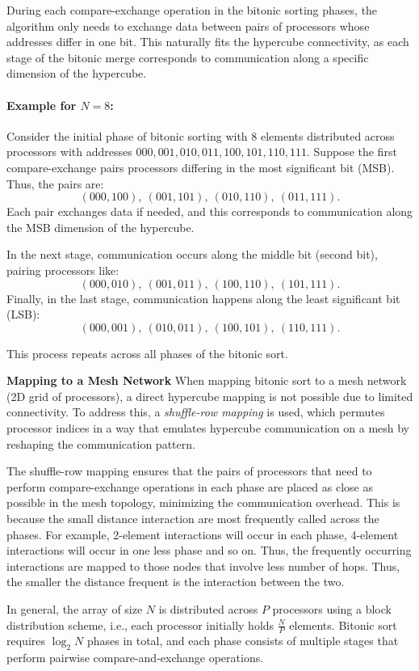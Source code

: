 \documentclass[12pt]{book}
\begin{document}
During each compare-exchange operation in the bitonic sorting phases, the algorithm only needs to 
exchange data between pairs of processors whose addresses differ in one bit. This naturally fits the hypercube connectivity, as each stage of the bitonic merge corresponds to communication along a specific dimension of the hypercube.

\paragraph{Example for \( N=8 \):}

Consider the initial phase of bitonic sorting with 8 elements distributed across processors 
with addresses \( 000, 001, 010, 011, 100, 101, 110, 111 \).
Suppose the first compare-exchange pairs processors differing in the most significant bit (MSB).
Thus, the pairs are:
\[
(000,100), \ (001,101), \ (010,110), \ (011,111).
\]
Each pair exchanges data if needed, and this corresponds to communication along the MSB dimension of the hypercube.

In the next stage, communication occurs along the middle bit (second bit), 
pairing processors like:
\[
(000,010), \ (001,011), \ (100,110), \ (101,111).
\]
Finally, in the last stage, communication happens along the least significant bit (LSB):
\[
(000,001), \ (010,011), \ (100,101), \ (110,111).
\]

This process repeats across all phases of the bitonic sort.

\textbf{Mapping to a Mesh Network}
When mapping bitonic sort to a mesh network (2D grid of processors), a direct hypercube mapping is not possible due to limited connectivity. To address this, a \emph{shuffle-row mapping} is used, which permutes processor indices in a way that emulates hypercube communication 
on a mesh by reshaping the communication pattern.

The shuffle-row mapping ensures that the pairs of processors that need to perform compare-exchange operations in each phase are placed as close as possible in the mesh topology, minimizing the communication overhead. This is because the small distance interaction are most frequently called across the phases. For example, 2-element interactions will occur in each phase, 4-element interactions will occur in one less phase and so on. Thus, the frequently occurring interactions are mapped to those nodes that involve less number of hops. Thus, the smaller the distance frequent is the interaction between the two.

In general, the array of size $N$ is distributed across $P$ processors using a block distribution scheme, i.e., each processor initially holds $\frac{N}{P}$ elements. Bitonic sort requires $\log_2 N$ phases in total, and each phase consists of multiple stages that perform pairwise compare-and-exchange operations.
\end{document}
